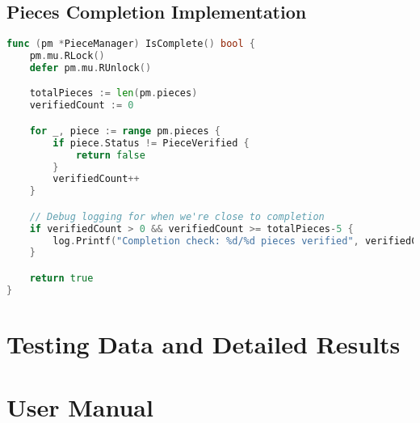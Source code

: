 \documentclass[12pt,a4paper]{report}
\begin{document}
\section{Pieces Completion Implementation}
\begin{lstlisting}[language=Go, caption={Pieces Completion Code}, label={lst:piece-completion}]
func (pm *PieceManager) IsComplete() bool {
	pm.mu.RLock()
	defer pm.mu.RUnlock()

	totalPieces := len(pm.pieces)
	verifiedCount := 0

	for _, piece := range pm.pieces {
		if piece.Status != PieceVerified {
			return false
		}
		verifiedCount++
	}

	// Debug logging for when we're close to completion
	if verifiedCount > 0 && verifiedCount >= totalPieces-5 {
		log.Printf("Completion check: %d/%d pieces verified", verifiedCount, totalPieces)
	}

	return true
}
\end{lstlisting}

\chapter{Testing Data and Detailed Results}

\chapter{User Manual}

\renewcommand\bibname{References}
\begin{raggedright} %
	
	
\end{raggedright}
\end{document}

